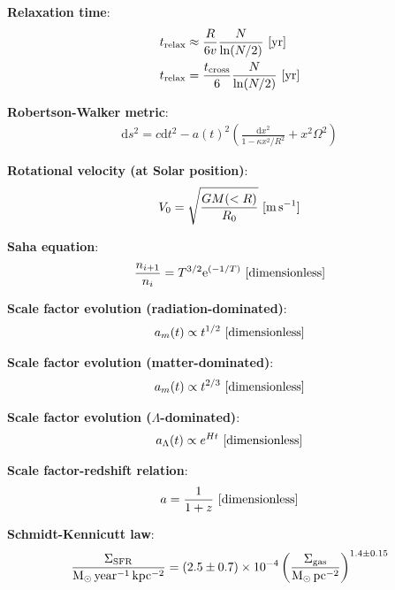 \documentclass[a4paper,11pt]{article}
\begin{document}
{\noindent}\textbf{Relaxation time}:
\begin{align*}
    t_\mathrm{relax} &\approx \frac{R}{6v} \frac{N}{\ln(N/2)} ~ [{\rm yr}] \\
    t_\mathrm{relax} &= \frac{t_\mathrm{cross}}{6} \frac{N}{\ln(N/2)} ~ [{\rm yr}]
\end{align*}

{\noindent}\textbf{Robertson-Walker metric}:
\begin{align*}
    \mathrm{d}s^2 = c\mathrm{d}t^2 -a(t)^2 \left( \frac{\mathrm{d}x^2}{1-\kappa x^2/R^2} + x^2\Omega^2 \right)
\end{align*}

{\noindent}\textbf{Rotational velocity (at Solar position)}:
\begin{align*}
    V_0 = \sqrt{\frac{GM(<R)}{R_0}} ~ [{\rm m\,s^{-1}}]
\end{align*}

{\noindent}\textbf{Saha equation}:
\begin{align*}
    \frac{n_{i+1}}{n_i} = T^{3/2}\mathrm{e}^{(-1/T)} ~ [{\rm dimensionless}]
\end{align*}

{\noindent}\textbf{Scale factor evolution (radiation-dominated)}:
\begin{align*}
    a_m(t) \propto t^{1/2} ~ [{\rm dimensionless}]
\end{align*}

{\noindent}\textbf{Scale factor evolution (matter-dominated)}:
\begin{align*}
    a_m(t) \propto t^{2/3} ~ [{\rm dimensionless}]
\end{align*}

{\noindent}\textbf{Scale factor evolution ($\Lambda$-dominated)}:
\begin{align*}
    a_\Lambda(t) \propto e^{Ht} ~ [{\rm dimensionless}]
\end{align*}

{\noindent}\textbf{Scale factor-redshift relation}:
\begin{align*}
    a = \dfrac{1}{1+z} ~ [{\rm dimensionless}]
\end{align*}

{\noindent}\textbf{Schmidt-Kennicutt law}:
\begin{align*}
    \frac{\Sigma_\mathrm{SFR}}{{\rm M_\odot\,year^{-1}\,kpc^{-2}}} = (2.5\pm0.7)\times10^{-4} \left(\frac{\Sigma_\mathrm{gas}}{{\rm M_\odot\,pc^{-2}}}\right)^{1.4\pm0.15}
\end{align*}
\end{document}
